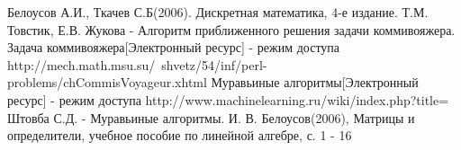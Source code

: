 \documentclass[12pt]{report}
\begin{document}
\begin{thebibliography}{3}
	 Белоусов А.И., Ткачев С.Б(2006). Дискретная математика, 4-е издание.
	 Т.М. Товстик, Е.В. Жукова - Алгоритм приближенного решения задачи коммивояжера.
	 Задача коммивояжера[Электронный ресурс] - режим доступа http://mech.math.msu.su/~shvetz/54/inf/perl-problems/chCommisVoyageur.xhtml
	 Муравьиные алгоритмы[Электронный ресурс] - режим доступа http://www.machinelearning.ru/wiki/index.php?title=%
	 Штовба С.Д. - Муравьиные алгоритмы.
	 И. В. Белоусов(2006), Матрицы и определители, учебное пособие по линейной алгебре, с. 1 - 16
\end{thebibliography}
\end{document}

